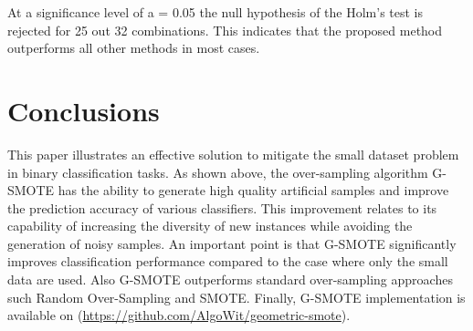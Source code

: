 \documentclass[parskip=full]{scrartcl}
\begin{document}
At a significance level of a = 0.05 the null hypothesis of the Holm's test is
rejected for 25 out 32 combinations. This indicates that the proposed method
outperforms all other methods in most cases.  

\section{Conclusions}

This paper illustrates an effective solution to mitigate the small dataset
problem in binary classification tasks. As shown above, the over-sampling
algorithm G-SMOTE has the ability to generate high quality artificial samples
and improve the prediction accuracy of various classifiers. This improvement
relates to its capability of increasing the diversity of new instances while
avoiding the generation of noisy samples. An important point is that G-SMOTE
significantly improves classification performance compared to the case where
only the small data are used. Also G-SMOTE outperforms standard over-sampling
approaches such Random Over-Sampling and SMOTE. Finally, G-SMOTE implementation
is available on (\url{https://github.com/AlgoWit/geometric-smote}).



\end{document}
